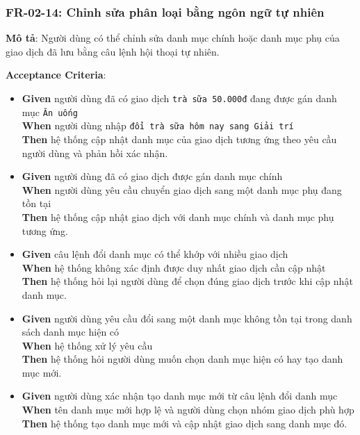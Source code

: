 \subsubsection{FR-02-14: Chỉnh sửa phân loại bằng ngôn ngữ tự nhiên}

\textbf{Mô tả}: Người dùng có thể chỉnh sửa danh mục chính hoặc danh mục phụ của giao dịch đã lưu bằng câu lệnh hội thoại tự nhiên.



\textbf{Acceptance Criteria}:

\begin{itemize}
\item \textbf{Given} người dùng đã có giao dịch \texttt{trà sữa 50.000đ} đang được gán danh mục \texttt{Ăn uống}  \\ \hspace*{1.5em}  \textbf{When} người dùng nhập \texttt{đổi trà sữa hôm nay sang Giải trí}  \\ \hspace*{1.5em}  \textbf{Then} hệ thống cập nhật danh mục của giao dịch tương ứng theo yêu cầu người dùng và phản hồi xác nhận.
\item \textbf{Given} người dùng đã có giao dịch được gán danh mục chính  \\ \hspace*{1.5em}  \textbf{When} người dùng yêu cầu chuyển giao dịch sang một danh mục phụ đang tồn tại  \\ \hspace*{1.5em}  \textbf{Then} hệ thống cập nhật giao dịch với danh mục chính và danh mục phụ tương ứng.
\item \textbf{Given} câu lệnh đổi danh mục có thể khớp với nhiều giao dịch  \\ \hspace*{1.5em}  \textbf{When} hệ thống không xác định được duy nhất giao dịch cần cập nhật  \\ \hspace*{1.5em}  \textbf{Then} hệ thống hỏi lại người dùng để chọn đúng giao dịch trước khi cập nhật danh mục.
\item \textbf{Given} người dùng yêu cầu đổi sang một danh mục không tồn tại trong danh sách danh mục hiện có  \\ \hspace*{1.5em}  \textbf{When} hệ thống xử lý yêu cầu  \\ \hspace*{1.5em}  \textbf{Then} hệ thống hỏi người dùng muốn chọn danh mục hiện có hay tạo danh mục mới.
\item \textbf{Given} người dùng xác nhận tạo danh mục mới từ câu lệnh đổi danh mục  \\ \hspace*{1.5em}  \textbf{When} tên danh mục mới hợp lệ và người dùng chọn nhóm giao dịch phù hợp  \\ \hspace*{1.5em}  \textbf{Then} hệ thống tạo danh mục mới và cập nhật giao dịch sang danh mục đó.
\end{itemize}

